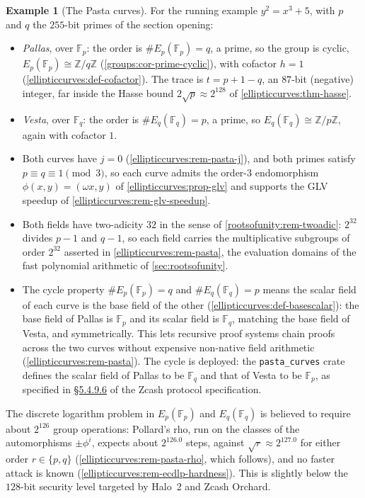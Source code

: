 \documentclass[11pt,a4paper]{article}
\theoremstyle{definition}
\newtheorem{example}[theorem]{Example}
\theoremstyle{remark}
\newcommand{\Z}{\ensuremath{\mathbb{Z}}}
\newcommand{\Fp}{\ensuremath{\mathbb{F}_{p}}}
\newcommand{\Fq}{\ensuremath{\mathbb{F}_{q}}}
\begin{document}
\begin{example}[The Pasta curves]\label{ellipticcurves:exa-pasta}
For the running example \(y^2 = x^3 + 5\), with \(p\) and \(q\) the
\(255\)-bit primes of the section opening:
\begin{itemize}
  \item \emph{Pallas}, over \(\Fp\): the order is
    \(\#E_p(\Fp) = q\), a prime, so the group is cyclic,
    \(E_p(\Fp) \cong \Z/q\Z\) (\cref{groups:cor-prime-cyclic}), with
    cofactor \(h = 1\) (\cref{ellipticcurves:def-cofactor}). The trace
    is \(t = p + 1 - q\), an \(87\)-bit (negative) integer, far inside
    the Hasse bound \(2\sqrt{p} \approx 2^{128}\) of
    \cref{ellipticcurves:thm-hasse}.
  \item \emph{Vesta}, over \(\Fq\): the order is
    \(\#E_q(\Fq) = p\), a prime, so
    \(E_q(\Fq) \cong \Z/p\Z\), again with cofactor \(1\).
  \item Both curves have \(j = 0\)
    (\cref{ellipticcurves:rem-pasta-j}), and both primes satisfy
    \(p \equiv q \equiv 1 \pmod 3\), so each curve admits the
    order-\(3\) endomorphism \(\phi(x, y) = (\omega x, y)\) of
    \cref{ellipticcurves:prop-glv} and supports the GLV speedup of
    \cref{ellipticcurves:rem-glv-speedup}.
  \item Both fields have two-adicity \(32\) in the sense of
    \cref{rootsofunity:rem-twoadic}: \(2^{32}\) divides \(p - 1\) and
    \(q - 1\), so each field carries the multiplicative subgroups of
    order \(2^{32}\) asserted in
    \cref{ellipticcurves:rem-pasta}, the evaluation domains of the
    fast polynomial arithmetic of \cref{sec:rootsofunity}.
  \item The cycle property \(\#E_p(\Fp) = q\) and
    \(\#E_q(\Fq) = p\) means the scalar field of each curve is the base
    field of the other (\cref{ellipticcurves:def-basescalar}): the base
    field of Pallas is \(\Fp\) and its scalar field is \(\Fq\),
    matching the base field of Vesta, and symmetrically. This lets
    recursive proof systems chain proofs across the two curves without
    expensive non-native field arithmetic
    (\cref{ellipticcurves:rem-pasta}). The cycle is deployed: the
    \texttt{pasta\_curves} crate defines the scalar field of Pallas to
    be \(\Fq\) and that of Vesta to be \(\Fp\), as specified in
    \href{https://zips.z.cash/protocol/protocol.pdf\#pallasandvesta}{\S5.4.9.6} of the Zcash
    protocol specification.
\end{itemize}
The discrete logarithm problem in \(E_p(\Fp)\) and \(E_q(\Fq)\) is
believed to require about \(2^{126}\) group operations: Pollard's rho,
run on the classes of the automorphisms \(\pm\phi^i\), expects about
\(2^{126.0}\) steps, against \(\sqrt r \approx 2^{127.0}\) for either order
\(r \in \{p, q\}\) (\cref{ellipticcurves:rem-pasta-rho}, which follows), and
no faster attack is known (\cref{ellipticcurves:rem-ecdlp-hardness}). This is
slightly below the \(128\)-bit security level targeted by Halo~2 and Zcash
Orchard.
\end{example}
\end{document}
